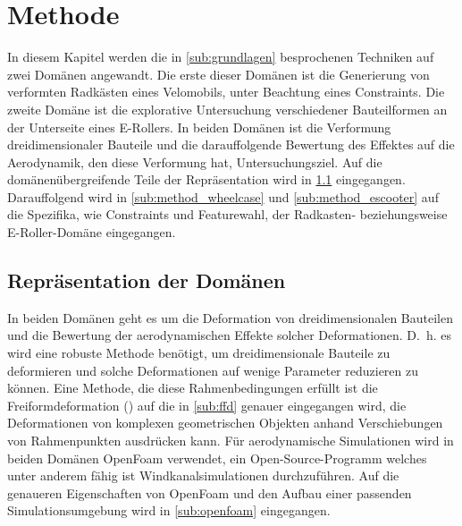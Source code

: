 \clearpage

\section{Methode}

In diesem Kapitel werden die in \cref{sub:grundlagen} besprochenen Techniken auf zwei Domänen angewandt.
Die erste dieser Domänen ist die Generierung von verformten Radkästen eines Velomobils, unter Beachtung eines Constraints.
Die zweite Domäne ist die explorative Untersuchung verschiedener Bauteilformen an der Unterseite eines E-Rollers.
In beiden Domänen ist die Verformung dreidimensionaler Bauteile und die darauffolgende Bewertung des Effektes auf die Aerodynamik, den diese Verformung hat, Untersuchungsziel.
Auf die domänenübergreifende Teile der Repräsentation wird in \cref{sub:representation} eingegangen.
Darauffolgend wird in \cref{sub:method_wheelcase} und \cref{sub:method_escooter} auf die Spezifika, wie Constraints und Featurewahl, der Radkasten- beziehungsweise E-Roller-Domäne eingegangen.

\subsection{Repräsentation der Domänen}
\label{sub:representation}

In beiden Domänen geht es um die Deformation von dreidimensionalen Bauteilen und die Bewertung der aerodynamischen Effekte solcher Deformationen.
D.~h. es wird eine robuste Methode benötigt, um dreidimensionale Bauteile zu deformieren und solche Deformationen auf wenige Parameter reduzieren zu können.
Eine Methode, die diese Rahmenbedingungen erfüllt ist die Freiformdeformation (\cite{Sederberg.1986}) auf die in \cref{sub:ffd} genauer eingegangen wird, die Deformationen von komplexen geometrischen Objekten anhand Verschiebungen von Rahmenpunkten ausdrücken kann.
Für aerodynamische Simulationen wird in beiden Domänen OpenFoam verwendet, ein Open-Source-Programm welches unter anderem fähig ist Windkanalsimulationen durchzuführen.
Auf die genaueren Eigenschaften von OpenFoam und den Aufbau einer passenden Simulationsumgebung wird in \cref{sub:openfoam} eingegangen.

